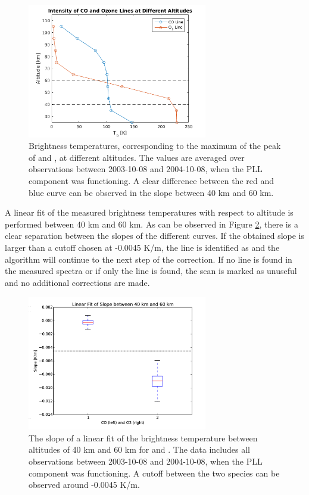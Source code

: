 \begin{figure}[ht!]
\begin{center}
\includegraphics[width=0.7\textwidth]{freq_corr_altitudeProf.png}
\caption{Brightness temperatures, corresponding to the maximum of the peak of  and , at different altitudes. The values are averaged over observations between 2003-10-08 and 2004-10-08, when the PLL component was functioning. A clear difference between the red and blue curve can be observed in the slope between 40 km and 60 km.}
\label{fig:altitudesCO}
\end{center}
\end{figure}

A linear fit of the measured brightness temperatures with respect to altitude is performed between 40 km and 60 km. As can be observed in Figure \ref{fig:slopesCOO3}, there is a clear separation between the slopes of the different curves. If the obtained slope is larger than a cutoff chosen at -0.0045 K/m, the line is identified as  and the algorithm will continue to the next step of the correction. If no line is found in the measured spectra or if only the  line is found, the scan is marked as unuseful and no additional corrections are made.

\begin{figure}[ht!]
\begin{center}
\includegraphics[width=0.7\textwidth]{freq_corr_slopeBox.png}
\caption{The slope of a linear fit of the brightness temperature between altitudes of 40 km and 60 km for  and . The data includes all observations between 2003-10-08 and 2004-10-08, when the PLL component was functioning. A cutoff between the two species can be observed around -0.0045 K/m.}
\label{fig:slopesCOO3}
\end{center}
\end{figure}

